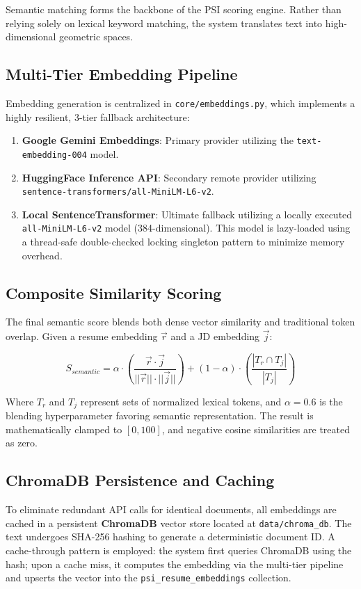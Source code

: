 \documentclass[10pt,journal,compsoc]{IEEEtran}
\begin{document}
Semantic matching forms the backbone of the PSI scoring engine. Rather than relying solely on lexical keyword matching, the system translates text into high-dimensional geometric spaces.

\subsection{Multi-Tier Embedding Pipeline}
Embedding generation is centralized in \texttt{core/embeddings.py}, which implements a highly resilient, 3-tier fallback architecture:
\begin{enumerate}
    \item \textbf{Google Gemini Embeddings}: Primary provider utilizing the \texttt{text-embedding-004} model.
    \item \textbf{HuggingFace Inference API}: Secondary remote provider utilizing \texttt{sentence-transformers/all-MiniLM-L6-v2}.
    \item \textbf{Local SentenceTransformer}: Ultimate fallback utilizing a locally executed \texttt{all-MiniLM-L6-v2} model (384-dimensional). This model is lazy-loaded using a thread-safe double-checked locking singleton pattern to minimize memory overhead.
\end{enumerate}

\subsection{Composite Similarity Scoring}
The final semantic score blends both dense vector similarity and traditional token overlap. Given a resume embedding $\vec{r}$ and a JD embedding $\vec{j}$:

\begin{equation}
    S_{semantic} = \alpha \cdot \left( \frac{\vec{r} \cdot \vec{j}}{||\vec{r}||\cdot||\vec{j}||} \right) + (1-\alpha) \cdot \left( \frac{|T_r \cap T_j|}{|T_j|} \right)
\end{equation}

Where $T_r$ and $T_j$ represent sets of normalized lexical tokens, and $\alpha = 0.6$ is the blending hyperparameter favoring semantic representation. The result is mathematically clamped to $[0, 100]$, and negative cosine similarities are treated as zero.

\subsection{ChromaDB Persistence and Caching}
To eliminate redundant API calls for identical documents, all embeddings are cached in a persistent \textbf{ChromaDB} vector store located at \texttt{data/chroma\_db}. 
The text undergoes SHA-256 hashing to generate a deterministic document ID. A cache-through pattern is employed: the system first queries ChromaDB using the hash; upon a cache miss, it computes the embedding via the multi-tier pipeline and upserts the vector into the \texttt{psi\_resume\_embeddings} collection.
\end{document}
